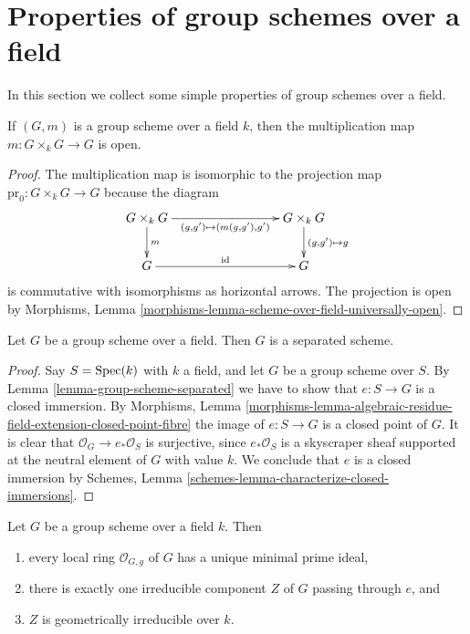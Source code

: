 \section{Properties of group schemes over a field}
\label{section-properties-group-schemes-field}

\noindent
In this section we collect some simple properties of group schemes over a
field.

\begin{lemma}
\label{lemma-group-scheme-over-field-open-multiplication}
If $(G, m)$ is a group scheme over a field $k$, then the
multiplication map $m : G \times_k G \to G$ is open.
\end{lemma}

\begin{proof}
The multiplication map is isomorphic to the projection map
$\text{pr}_0 : G \times_k G \to G$
because the diagram
$$
\xymatrix{
G \times_k G \ar[d]^m \ar[rrr]_{(g, g') \mapsto (m(g, g'), g')} & & &
G \times_k G \ar[d]^{(g, g') \mapsto g} \\
G \ar[rrr]^{\text{id}} & & & G
}
$$
is commutative with isomorphisms as horizontal arrows. The projection
is open by
Morphisms, Lemma \ref{morphisms-lemma-scheme-over-field-universally-open}.
\end{proof}

\begin{lemma}
\label{lemma-group-scheme-over-field-separated}
Let $G$ be a group scheme over a field.
Then $G$ is a separated scheme.
\end{lemma}

\begin{proof}
Say $S = \mathop{\rm Spec}(k)$ with $k$ a field, and let $G$ be a group scheme
over $S$. By
Lemma \ref{lemma-group-scheme-separated}
we have to show that $e : S \to G$ is a closed immersion. By
Morphisms, Lemma
\ref{morphisms-lemma-algebraic-residue-field-extension-closed-point-fibre}
the image of $e : S \to G$ is a closed point of $G$.
It is clear that $\mathcal{O}_G \to e_*\mathcal{O}_S$ is surjective,
since $e_*\mathcal{O}_S$ is a skyscraper sheaf supported at the neutral
element of $G$ with value $k$. We conclude that $e$ is a closed immersion by
Schemes, Lemma \ref{schemes-lemma-characterize-closed-immersions}.
\end{proof}

\begin{lemma}
\label{lemma-group-scheme-field-geometrically-irreducible}
Let $G$ be a group scheme over a field $k$.
Then
\begin{enumerate}
\item every local ring $\mathcal{O}_{G, g}$ of $G$ has a unique
minimal prime ideal,
\item there is exactly one irreducible component $Z$ of $G$
passing through $e$, and
\item $Z$ is geometrically irreducible over $k$.
\end{enumerate}
\end{lemma}

